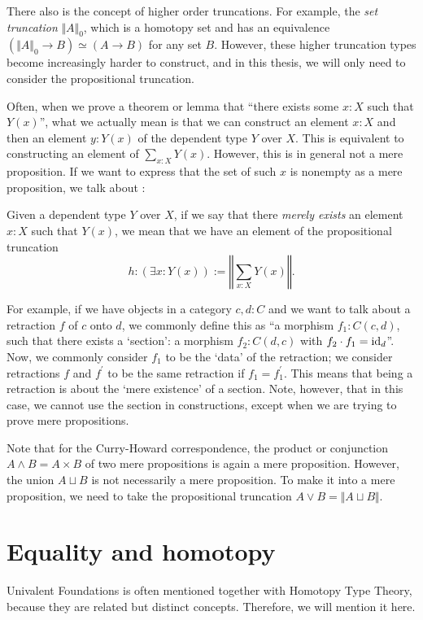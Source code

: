 There also is the concept of higher order truncations. For example, the \textit{set truncation} $ \Vert A \Vert_0 $, which is a homotopy set and has an equivalence $ (\Vert A \Vert_0 \to B) \simeq (A \to B) $ for any set $ B $. However, these higher truncation types become increasingly harder to construct, and in this thesis, we will only need to consider the propositional truncation.

Often, when we prove a theorem or lemma that ``there exists some $ x: X $ such that $ Y(x) $'', what we actually mean is that we can construct an element $ x: X $ and then an element $ y : Y(x) $ of the dependent type $ Y $ over $ X $. This is equivalent to constructing an element of $ \sum_{x: X} Y(x) $. However, this is in general not a mere proposition. If we want to express that the set of such $ x $ is nonempty as a mere proposition, we talk about :
\begin{definition}\label{def:mere-existence}
  Given a dependent type $ Y $ over $ X $, if we say that there \textit{merely exists} an element $ x: X $ such that $ Y(x) $, we mean that we have an element of the propositional truncation
  \[ h: \left(\exists x: Y(x)\right) := \left\Vert \sum_{x: X} Y(x) \right\Vert. \]
\end{definition}

For example, if we have objects in a category $ c, d: C $ and we want to talk about a retraction $ f $ of $ c $ onto $ d $, we commonly define this as ``a morphism $ f_1: C(c, d) $, such that there exists a `section': a morphism $ f_2: C(d, c) $ with $ f_2 \cdot f_1 = \text{id}_{d} $''. Now, we commonly consider $ f_1 $ to be the `data' of the retraction; we consider retractions $ f $ and $ f^\prime $ to be the same retraction if $ f_1 = f^\prime_1 $. This means that being a retraction is about the `mere existence' of a section. Note, however, that in this case, we cannot use the section in constructions, except when we are trying to prove mere propositions.

Note that for the Curry-Howard correspondence, the product or conjunction $ A \land B = A \times B $ of two mere propositions is again a mere proposition. However, the union $ A \sqcup B $ is not necessarily a mere proposition. To make it into a mere proposition, we need to take the propositional truncation $ A \lor B = \Vert A \sqcup B \Vert $.

\section{Equality and homotopy}
Univalent Foundations is often mentioned together with Homotopy Type Theory, because they are related but distinct concepts. Therefore, we will mention it here.

